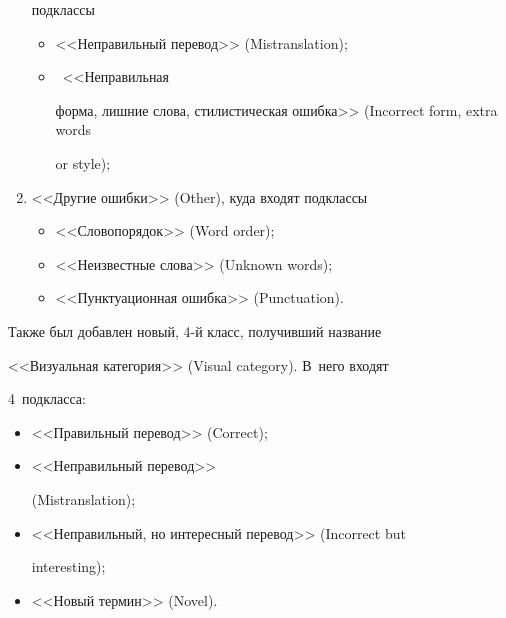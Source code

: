 \begin{multicols}{2}
\begin{enumerate}[(1)]
подклассы


\begin{itemize}


\item  <<Неправильный перевод>> (Mistranslation);


\item ~<<Неправильная 


форма, лишние слова, стилистическая ошибка>> (Incorrect form, extra words 


or style);


\end{itemize} 


\item <<Другие ошибки>> (Other), куда входят подклассы 


\begin{itemize}


\item <<Словопорядок>> (Word order); 


\item <<Неизвестные слова>> (Unknown words); 


\item <<Пунктуационная ошибка>> (Punctuation).


\end{itemize}


\end{enumerate}


  


  Также был добавлен новый, 4-й класс, получивший название 


<<Визуальная категория>> (Visual category). В~него входят 


4~подкласса: 


\begin{itemize}


\item <<Правильный перевод>> (Correct); 


\item <<Неправильный перевод>> 


(Mistranslation); 


\item <<Неправильный, но интересный перевод>> (Incorrect but 


interesting); 


\item <<Новый термин>> (Novel).


\end{itemize}






\end{multicols}
